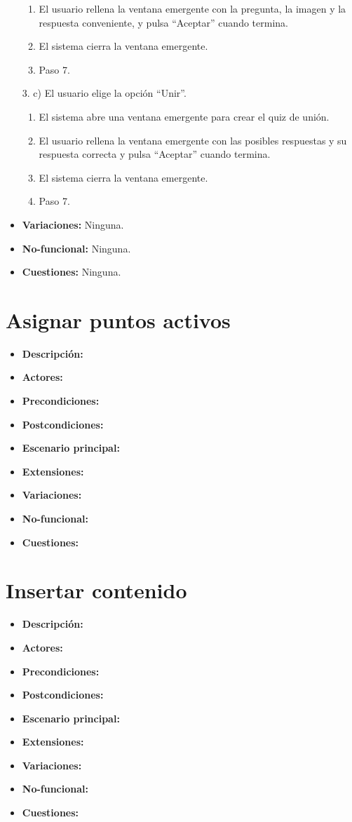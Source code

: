 \documentclass[12pt,letterpaper]{article}
\begin{document}
\begin{itemize}
\begin{enumerate}
		\item El usuario rellena la ventana emergente con la pregunta, la imagen y la respuesta conveniente, y pulsa ``Aceptar'' cuando termina.
		\item El sistema cierra la ventana emergente.
		\item Paso 7.
	\end{enumerate}
	3. c) El usuario elige la opción ``Unir''.
	\begin{enumerate}
		\item El sistema abre una ventana emergente para crear el quiz de unión.
		\item El usuario rellena la ventana emergente con las posibles respuestas y su respuesta correcta y pulsa ``Aceptar'' cuando termina.
		\item El sistema cierra la ventana emergente.
		\item Paso 7.
	\end{enumerate}
	\item \textbf{Variaciones:} Ninguna.
	\item \textbf{No-funcional:} Ninguna.
	\item \textbf{Cuestiones:} Ninguna.
\end{itemize}

\section{Asignar puntos activos}
\begin{itemize}
	\item \textbf{Descripción:} 
	\item \textbf{Actores:}
	\item \textbf{Precondiciones:}
	\item \textbf{Postcondiciones:}
	\item \textbf{Escenario principal:}
	\item \textbf{Extensiones:}
	\item \textbf{Variaciones:}
	\item \textbf{No-funcional:}
	\item \textbf{Cuestiones:}
\end{itemize}

\section{Insertar contenido}
\begin{itemize}
	\item \textbf{Descripción:}
	\item \textbf{Actores:}
	\item \textbf{Precondiciones:}
	\item \textbf{Postcondiciones:}
	\item \textbf{Escenario principal:}
	\item \textbf{Extensiones:}
	\item \textbf{Variaciones:}
	\item \textbf{No-funcional:}
	\item \textbf{Cuestiones:}
\end{itemize}
\end{document}
